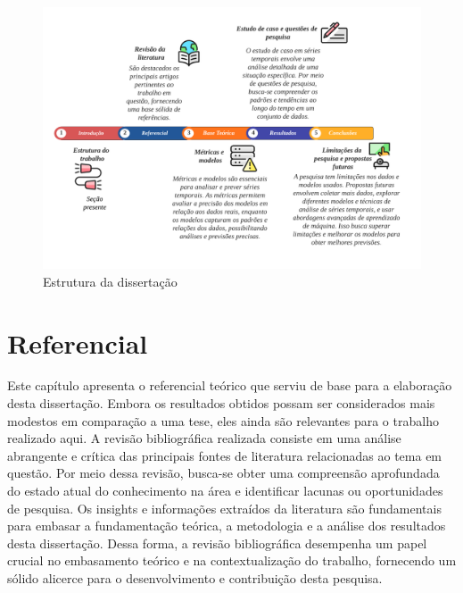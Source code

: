  \begin{figure}[!htb]
 	\centering
 	\caption{Estrutura da dissertação}
 	\label{fig:estrutura}
 	\includegraphics[width=\linewidth]{Introducao/Figuras/Estrutura}
 	
 \end{figure}

\section{Referencial}\label{sec:refteo}


Este capítulo apresenta o referencial teórico que serviu de base para a elaboração desta dissertação. Embora os resultados obtidos possam ser considerados mais modestos em comparação a uma tese, eles ainda são relevantes para o trabalho realizado aqui. A revisão bibliográfica realizada consiste em uma análise abrangente e crítica das principais fontes de literatura relacionadas ao tema em questão. Por meio dessa revisão, busca-se obter uma compreensão aprofundada do estado atual do conhecimento na área e identificar lacunas ou oportunidades de pesquisa. Os insights e informações extraídos da literatura são fundamentais para embasar a fundamentação teórica, a metodologia e a análise dos resultados desta dissertação. Dessa forma, a revisão bibliográfica desempenha um papel crucial no embasamento teórico e na contextualização do trabalho, fornecendo um sólido alicerce para o desenvolvimento e contribuição desta pesquisa.












